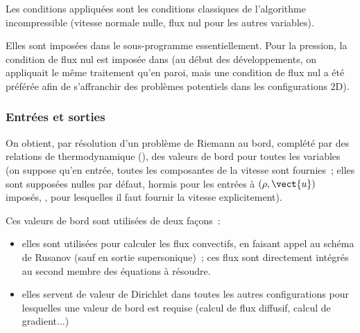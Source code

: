 Les conditions appliquées sont les conditions classiques de l'algorithme
incompressible (vitesse normale nulle, flux nul pour les autres variables).

Elles sont imposées dans le sous-programme  essentiellement. Pour
la pression, la condition de flux nul est imposée dans 
(au début des développements, on appliquait le même traitement qu'en paroi,
mais une condition de flux nul a été préférée afin de s'affranchir des
problèmes potentiels dans les configurations 2D).


\subsubsection*{Entrées et sorties}

On obtient, par résolution d'un problème de Riemann au bord, complété par
des relations de thermodynamique (), des valeurs de bord pour toutes
les variables (on suppose qu'en entrée, toutes les composantes de la vitesse
sont fournies~; elles sont supposées nulles par défaut, hormis pour les
entrées à $(\rho,\vect{u})$ imposés, , pour lesquelles il faut
fournir la vitesse explicitement).

Ces valeurs de bord sont utilisées de deux façons~:
\begin{itemize}
\item elles sont utilisées pour calculer les flux convectifs, en faisant
appel au schéma de Rusanov (sauf en sortie supersonique)~; ces flux sont
directement intégrés au second membre des équations à résoudre.
\item elles servent de valeur de Dirichlet dans toutes les autres configurations
pour lesquelles une valeur de bord est requise (calcul de flux diffusif,
calcul de gradient...)
\end{itemize}

